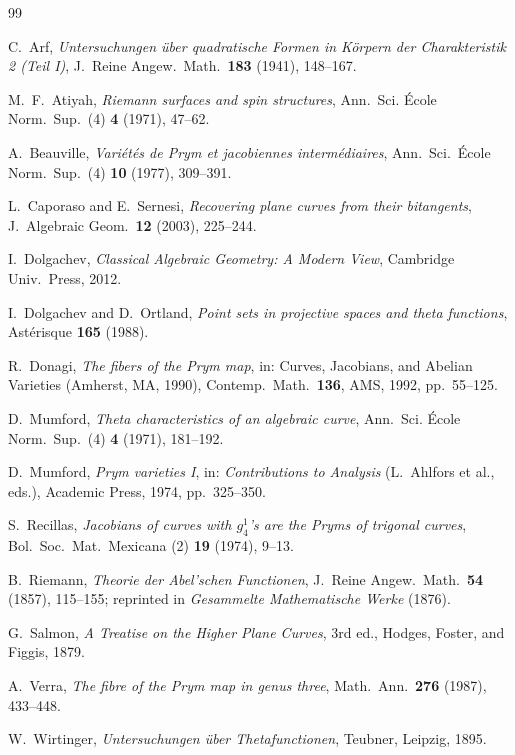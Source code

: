 \documentclass[11pt]{amsart}
\theoremstyle{plain}
\theoremstyle{definition}
\theoremstyle{remark}
\begin{document}
\begin{thebibliography}{99}

C.~Arf, \emph{Untersuchungen \"uber quadratische Formen in K\"orpern der
Charakteristik 2 (Teil I)}, J.~Reine Angew.\ Math.\ \textbf{183} (1941),
148--167.

M.~F.~Atiyah, \emph{Riemann surfaces and spin structures}, Ann.\ Sci.
\'Ecole Norm.\ Sup.\ (4) \textbf{4} (1971), 47--62.

A.~Beauville, \emph{Vari\'et\'es de Prym et jacobiennes interm\'ediaires},
Ann.\ Sci.\ \'Ecole Norm.\ Sup.\ (4) \textbf{10} (1977), 309--391.

L.~Caporaso and E.~Sernesi, \emph{Recovering plane curves from their
bitangents}, J.\ Algebraic Geom.\ \textbf{12} (2003), 225--244.

I.~Dolgachev, \emph{Classical Algebraic Geometry: A Modern View}, Cambridge
Univ.\ Press, 2012.

I.~Dolgachev and D.~Ortland, \emph{Point sets in projective spaces and theta
functions}, Ast\'erisque \textbf{165} (1988).

R.~Donagi, \emph{The fibers of the Prym map}, in: Curves, Jacobians, and
Abelian Varieties (Amherst, MA, 1990), Contemp.\ Math.\ \textbf{136}, AMS,
1992, pp.~55--125.

D.~Mumford, \emph{Theta characteristics of an algebraic curve}, Ann.\ Sci.
\'Ecole Norm.\ Sup.\ (4) \textbf{4} (1971), 181--192.

D.~Mumford, \emph{Prym varieties I}, in: \emph{Contributions to Analysis}
(L.~Ahlfors et al., eds.), Academic Press, 1974, pp.~325--350.

S.~Recillas, \emph{Jacobians of curves with $g^1_4$'s are the Pryms of
trigonal curves}, Bol.\ Soc.\ Mat.\ Mexicana (2) \textbf{19} (1974), 9--13.

B.~Riemann, \emph{Theorie der Abel'schen Functionen}, J.~Reine Angew.\
Math.\ \textbf{54} (1857), 115--155; reprinted in
\emph{Gesammelte Mathematische Werke} (1876).

G.~Salmon, \emph{A Treatise on the Higher Plane Curves}, 3rd ed., Hodges,
Foster, and Figgis, 1879.

A.~Verra, \emph{The fibre of the Prym map in genus three}, Math.\ Ann.\
\textbf{276} (1987), 433--448.

W.~Wirtinger, \emph{Untersuchungen \"uber Thetafunctionen}, Teubner,
Leipzig, 1895.

\end{thebibliography}
\end{document}

